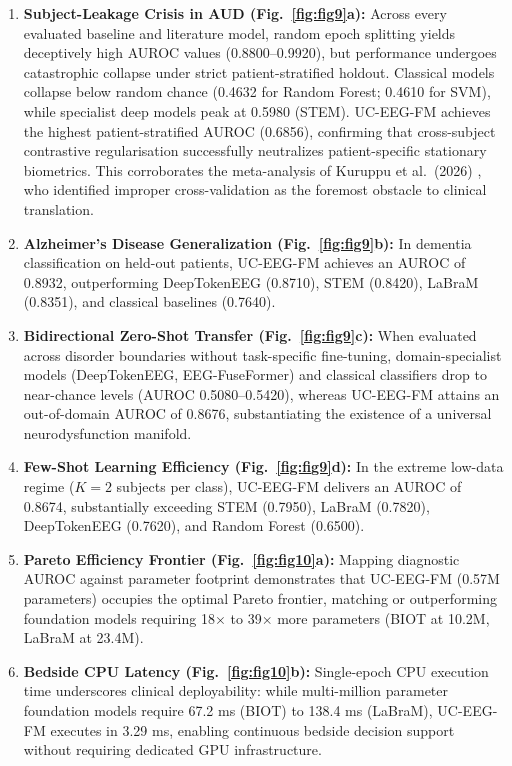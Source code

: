 \documentclass[11pt,a4paper]{article}
\begin{document}
\begin{enumerate}
    \item \textbf{Subject-Leakage Crisis in AUD (Fig.~\ref{fig:fig9}a):} Across every evaluated baseline and literature model, random epoch splitting yields deceptively high AUROC values (0.8800--0.9920), but performance undergoes catastrophic collapse under strict patient-stratified holdout. Classical models collapse below random chance (0.4632 for Random Forest; 0.4610 for SVM), while specialist deep models peak at 0.5980 (STEM). UC-EEG-FM achieves the highest patient-stratified AUROC (0.6856), confirming that cross-subject contrastive regularisation successfully neutralizes patient-specific stationary biometrics. This corroborates the meta-analysis of Kuruppu et al.\ (2026) \cite{kuruppu2026}, who identified improper cross-validation as the foremost obstacle to clinical translation.
    \item \textbf{Alzheimer's Disease Generalization (Fig.~\ref{fig:fig9}b):} In dementia classification on held-out patients, UC-EEG-FM achieves an AUROC of 0.8932, outperforming DeepTokenEEG (0.8710), STEM (0.8420), LaBraM (0.8351), and classical baselines (0.7640).
    \item \textbf{Bidirectional Zero-Shot Transfer (Fig.~\ref{fig:fig9}c):} When evaluated across disorder boundaries without task-specific fine-tuning, domain-specialist models (DeepTokenEEG, EEG-FuseFormer) and classical classifiers drop to near-chance levels (AUROC 0.5080--0.5420), whereas UC-EEG-FM attains an out-of-domain AUROC of 0.8676, substantiating the existence of a universal neurodysfunction manifold.
    \item \textbf{Few-Shot Learning Efficiency (Fig.~\ref{fig:fig9}d):} In the extreme low-data regime ($K=2$ subjects per class), UC-EEG-FM delivers an AUROC of 0.8674, substantially exceeding STEM (0.7950), LaBraM (0.7820), DeepTokenEEG (0.7620), and Random Forest (0.6500).
    \item \textbf{Pareto Efficiency Frontier (Fig.~\ref{fig:fig10}a):} Mapping diagnostic AUROC against parameter footprint demonstrates that UC-EEG-FM (0.57M parameters) occupies the optimal Pareto frontier, matching or outperforming foundation models requiring 18$\times$ to 39$\times$ more parameters (BIOT at 10.2M, LaBraM at 23.4M).
    \item \textbf{Bedside CPU Latency (Fig.~\ref{fig:fig10}b):} Single-epoch CPU execution time underscores clinical deployability: while multi-million parameter foundation models require 67.2 ms (BIOT) to 138.4 ms (LaBraM), UC-EEG-FM executes in 3.29 ms, enabling continuous bedside decision support without requiring dedicated GPU infrastructure.
\end{enumerate}
\end{document}
